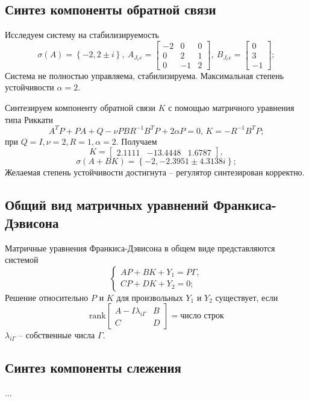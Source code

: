 \documentclass[a4paper, 12pt]{article}
\begin{document}
    \subsection{Синтез компоненты обратной связи}
    Исследуем систему на стабилизируемость
    $$
    \sigma\left( A \right)=\left\{ -2,2\pm i \right\},\ A_{J_re}=\begin{bmatrix}
        -2 &0 &0\\
        0 &2 &1\\
        0 &-1 &2
    \end{bmatrix},\ B_{J_re}=\begin{bmatrix}
        0\\3\\-1
    \end{bmatrix};
    $$
    Система не полностью управляема, стабилизируема. Максимальная степень
    устойчивости $\alpha=2$.


    Синтезируем компоненту обратной связи $K$ с помощью матричного уравнения
    типа Риккати
    $$
    A^TP+PA+Q-\nu PBR^{-1}B^TP+2\alpha P=0,\,K=-R^{-1}B^TP;
    $$
    при $Q=I,\nu=2,R=1,\alpha=2$. Получаем
    $$
    K=\begin{bmatrix}
        2.1111  &-13.4448    &1.6787
    \end{bmatrix},$$
    $$
    \sigma\left( A+BK \right)=\left\{ -2,-2.3951\pm 4.3138i \right\};
    $$
    Желаемая степень устойчивости достигнута -- регулятор синтезирован корректно.


    \subsection{Общий вид матричных уравнений Франкиса-Дэвисона}
    Матричные уравнения Франкиса-Дэвисона в общем виде представляются системой
    $$
    \begin{cases}
        AP+BK+Y_1=P\Gamma,\\
        CP+DK+Y_2=0;
    \end{cases}
    $$
    Решение относительно $P$ и $K$ для произвольных
    $Y_1$ и $Y_2$ существует, если
    $$
    \text{rank}\begin{bmatrix}
        A-I\lambda_{i\Gamma} &B\\
        C &D
    \end{bmatrix}=\text{число строк}
    $$
    $\lambda_{i\Gamma}$ -- собственные числа $\Gamma$.


    \subsection{Синтез компоненты слежения}
    ...
\end{document}
